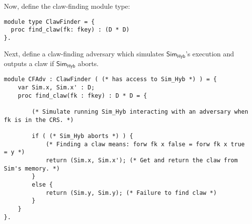 \documentclass{article}[11pt]
\newcommand{\Sim}{{\mathsf{Sim}}} %
\newcommand{\Hyb}{{\mathsf{Hyb}}}
\begin{document}
Now, define the claw-finding module type:
\begin{lstlisting}
module type ClawFinder = {
  proc find_claw(fk: fkey) : (D * D)
}.
\end{lstlisting}

Next, define a claw-finding adversary which simulates $\Sim_\Hyb$'s execution and outputs a claw if $\Sim_\Hyb$ aborts.
\begin{lstlisting}
module CFAdv : ClawFinder ( (* has access to Sim_Hyb *) ) = {
	var Sim.x, Sim.x' : D;
	proc find_claw(fk : fkey) : D * D = {

		(* Simulate running Sim_Hyb interacting with an adversary when fk is in the CRS. *)

		if ( (* Sim_Hyb aborts *) ) {
			(* Finding a claw means: forw fk x false = forw fk x true = y *)
			return (Sim.x, Sim.x'); (* Get and return the claw from Sim's memory. *)
		}
		else {
			return (Sim.y, Sim.y); (* Failure to find claw *)
		}
	}
}.
\end{lstlisting}

{\small{


}}
\end{document}

